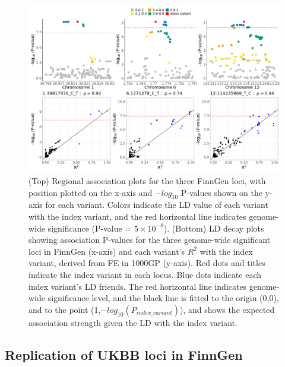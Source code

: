 \begin{figure}[H] 
  \centering    
  \includegraphics[width=1.0\textwidth]{Vector/finngen_regional_assoc_ld_decay_plots.png}
  \caption[Regional association plots and LD decay plots of the genome-wide significant loci in FinnGen summary statistics]{(Top) Regional association plots for the three FinnGen loci, with position plotted on the x-axis and $-log_{10}$ P-values shown on the y-axis for each variant. Colors indicate the LD value of each variant with the index variant, and the red horizontal line indicates genome-wide significance (P-value = $5\times10^{-8}$). (Bottom) LD decay plots showing association P-values for the three genome-wide significant loci in FinnGen (x-axis) and each variant's $R^{2}$ with the index variant, derived from FE in 1000GP (y-axis). Red dots and titles indicate the index variant in each locus. Blue dots indicate each index variant's LD friends. The red horizontal line indicates genome-wide significance level, and the black line is fitted to the origin (0,0), and to the point (1,$-log_{10}(P_{index\_variant})$), and shows the expected association strength given the LD with the index variant.}
  \label{fig:finngen_regional_assoc_ld_decay_plots}
  \end{figure}




\subsection{Replication of UKBB loci in FinnGen}

